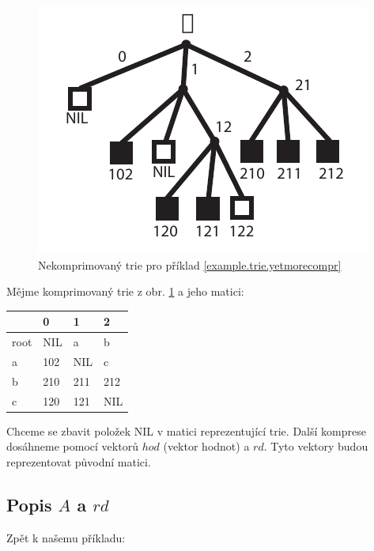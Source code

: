 \begin{priklad}
\label{example.trie.yetmorecompr}

\begin{figure}[!htb]
\centering\includegraphics{pics/trie-compr2}
\caption{Nekomprimovaný trie pro příklad \ref{example.trie.yetmorecompr}}
\label{fig.trie.compr}
\end{figure}

Mějme komprimovaný trie z obr. \ref{fig.trie.compr}
a jeho matici: 

\hspace{5mm}

\begin{tabular}{|l|l|l|l|}
\hline
 & 0 & 1 & 2 \\
\hline
root & NIL & a & b \\
a & 102 & NIL & c \\
b & 210 & 211 & 212 \\
c & 120 & 121 & NIL \\
\hline
\end{tabular}
\end{priklad}

\hspace{5mm}

Chceme se zbavit položek NIL v matici reprezentující trie. Další komprese
dosáhneme pomocí vektorů $hod$ (vektor hodnot) a $rd$. Tyto vektory budou
reprezentovat původní matici.


\subsection{Popis $A$ a $rd$}

Zpět k našemu příkladu:

